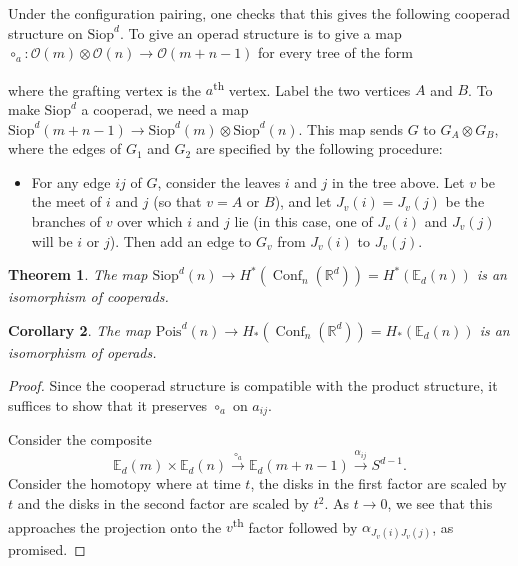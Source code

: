\documentclass{shortart}
\newcommand\E{\mathbb{E}}
\newtheorem{thm}{Theorem}[section]
\newtheorem{cor}[thm]{Corollary}
\theoremstyle{definition}
\DeclareMathOperator\Conf{Conf}
\newcommand\R{\mathbb{R}}
\newcommand\Pois{\mathrm{Pois}}
\newcommand\Siop{\mathrm{Siop}}
\begin{document}
Under the configuration pairing, one checks that this gives the following cooperad structure on $\Siop^d$. To give an operad structure is to give a map $\circ_a: \mathcal{O}(m) \otimes \mathcal{O}(n) \to \mathcal{O}(m + n - 1)$ for every tree of the form
\begin{center}
\end{center}
where the grafting vertex is the $a$\textsuperscript{th} vertex. Label the two vertices $A$ and $B$. To make $\Siop^d$ a cooperad, we need a map $\Siop^d(m + n - 1) \to \Siop^d(m) \otimes \Siop^d(n)$. This map sends $G$ to $G_A \otimes G_B$, where the edges of $G_1$ and $G_2$ are specified by the following procedure:
\begin{itemize}
  \item For any edge $ij$ of $G$, consider the leaves $i$ and $j$ in the tree above. Let $v$ be the meet of $i$ and $j$ (so that $v = A$ or $B$), and let $J_v(i) = J_v(j)$ be the branches of $v$ over which $i$ and $j$ lie (in this case, one of $J_v(i)$ and $J_v(j)$ will be $i$ or $j$). Then add an edge to $G_v$ from $J_v(i)$ to $J_v(j)$.
\end{itemize}

\begin{thm}
  The map $\Siop^d(n) \to H^*(\Conf_n(\R^d)) = H^*(\E_d(n))$ is an isomorphism of cooperads.
\end{thm}

\begin{cor}
  The map $\Pois^d(n) \to H_*(\Conf_n(\R^d)) = H_*(\E_d(n))$ is an isomorphism of operads.
\end{cor}

\begin{proof}
  Since the cooperad structure is compatible with the product structure, it suffices to show that it preserves $\circ_a$ on $a_{ij}$.

  Consider the composite
  \[
    \E_d(m) \times \E_d(n) \overset{\circ_a}{\longrightarrow} \E_d(m + n - 1) \overset{\alpha_{ij}}{\longrightarrow} S^{d - 1}.
  \]
  Consider the homotopy where at time $t$, the disks in the first factor are scaled by $t$ and the disks in the second factor are scaled by $t^2$. As $t \to 0$, we see that this approaches the projection onto the $v$\textsuperscript{th} factor followed by $\alpha_{J_v(i) J_v(j)}$, as promised.
\end{proof}
\end{document}
